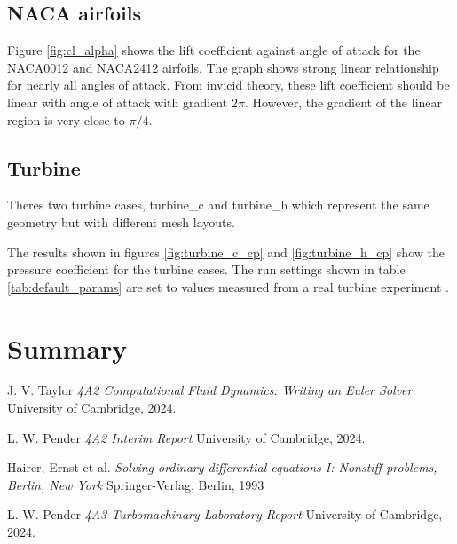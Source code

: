 \documentclass{article}
\begin{document}
\subsection{NACA airfoils}

Figure \ref{fig:cl_alpha} shows the lift coefficient against angle of attack for the NACA0012 and NACA2412 airfoils.
The graph shows strong linear relationship for nearly all angles of attack.
From invicid theory, these lift coefficient should be linear with angle of attack with gradient $ 2\pi $.
However, the gradient of the linear region is very close to $\pi/4$.




\subsection{Turbine}

Theres two turbine cases, turbine\_c and turbine\_h which represent the same geometry but with different mesh layouts.


The results shown in figures \ref{fig:turbine_c_cp} and \ref{fig:turbine_h_cp} show the pressure coefficient for the turbine cases.
The run settings shown in table \ref{tab:default_params} are set to values measured from a real turbine experiment \cite{4A3_lab}.

\section{Summary}

\begin{thebibliography}{9}

    J. V. Taylor
    \emph{4A2 Computational Fluid Dynamics: Writing an Euler Solver}
    University of Cambridge,
    2024.

    L. W. Pender
    \emph{4A2 Interim Report}
    University of Cambridge,
    2024.

    Hairer, Ernst et al.
    \emph{Solving ordinary differential equations I: Nonstiff problems, Berlin, New York}
    Springer-Verlag, Berlin, 1993

    L. W. Pender
    \emph{4A3 Turbomachinary Laboratory Report}
    University of Cambridge,
    2024.
  
\end{thebibliography}
\end{document}
